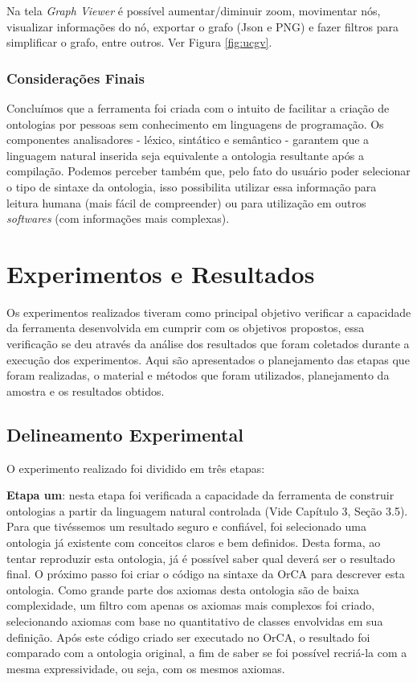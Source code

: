 \documentclass{bcc}
\begin{document}
Na tela \textit{Graph Viewer} é possível aumentar/diminuir zoom, movimentar nós, visualizar informações do nó, exportar o grafo (Json e PNG) e fazer filtros para simplificar o grafo, entre outros. Ver Figura \ref{fig:ucgv}.


\subsection{Considerações Finais}
Concluímos que a ferramenta foi criada com o intuito de facilitar a criação de ontologias por pessoas sem conhecimento em linguagens de programação. Os componentes analisadores - léxico, sintático e semântico - garantem que a linguagem natural inserida seja equivalente a ontologia resultante após a compilação. Podemos perceber também que, pelo fato do usuário poder selecionar o tipo de sintaxe da ontologia, isso possibilita utilizar essa informação para leitura humana (mais fácil de compreender) ou para utilização em outros \textit{softwares} (com informações mais complexas).


\chapter{Experimentos e Resultados}
\label{chap:exp}

Os experimentos realizados tiveram como principal objetivo verificar a capacidade da ferramenta desenvolvida em cumprir com os objetivos propostos, essa verificação se deu através da análise dos resultados que foram coletados durante a execução dos experimentos. Aqui são apresentados o planejamento das etapas que foram realizadas, o material e métodos que foram utilizados, planejamento da amostra e os resultados obtidos.


\section{Delineamento Experimental}
O experimento realizado foi dividido em três etapas: 

\textbf{Etapa um}: nesta etapa foi verificada a capacidade da ferramenta de construir ontologias a partir da linguagem natural controlada (Vide Capítulo 3, Seção 3.5). Para que tivéssemos um resultado seguro e confiável, foi selecionado uma ontologia já existente com conceitos claros e bem definidos. Desta forma, ao tentar reproduzir esta ontologia, já é possível saber qual deverá ser o resultado final. O próximo passo foi criar o código na sintaxe da OrCA para descrever esta ontologia. Como grande parte dos axiomas desta ontologia são de baixa complexidade, um filtro com apenas os axiomas mais complexos foi criado, selecionando axiomas com base no quantitativo de classes envolvidas em sua definição. Após este código criado ser executado no OrCA, o resultado foi comparado com a ontologia original, a fim de saber se foi possível recriá-la com a mesma expressividade, ou seja, com os mesmos axiomas.
\end{document}
